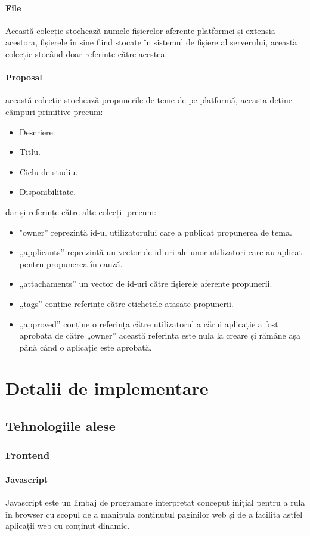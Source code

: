 \documentclass[12pt,a4paper,hidelinks]{report}
\theoremstyle{definition}
\theoremstyle{remark}
\begin{document}
\subsubsection{File}
Această colecție stochează numele fișierelor aferente platformei și extensia acestora, fișierele în sine fiind stocate în sistemul de fișiere al serverului, această colecție stocând doar referințe către acestea.
\subsubsection{Proposal}
această colecție stochează propunerile de teme de pe platformă, aceasta deține câmpuri primitive precum:
\begin{itemize}
    \item Descriere.
    \item Titlu.
    \item Ciclu de studiu.
    \item Disponibilitate.
\end{itemize}
dar și referințe către alte colecții precum:
\begin{itemize}
    \item "owner” reprezintă id-ul utilizatorului care a publicat propunerea de tema.
    \item „applicants” reprezintă un vector de id-uri ale unor utilizatori care au aplicat pentru propunerea în cauză.
    \item „attachaments” un vector de id-uri către fișierele aferente propunerii.
    \item „tags” conține referințe către etichetele atașate propunerii.
    \item „approved” conține o referința către utilizatorul a cărui aplicație a fost aprobată de către „owner” această referința este nula la creare și rămâne așa până când o aplicație este aprobată.
\end{itemize}
\chapter{Detalii de implementare}
\section{Tehnologiile alese}
\subsection{Frontend}
\subsubsection{Javascript}
Javascript\cite{5} este un limbaj de programare interpretat conceput inițial pentru a rula în browser cu scopul de a
manipula conținutul paginilor web și de a facilita astfel aplicații web cu conținut dinamic.
\end{document}
